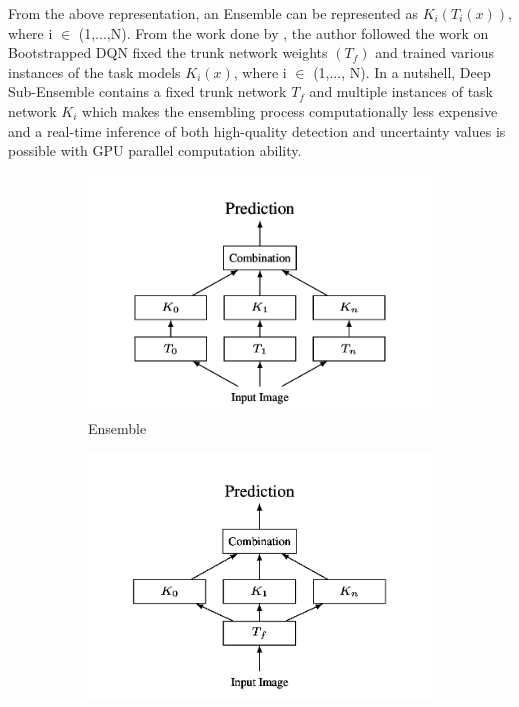     From the above representation, an Ensemble can be represented as $K_{i}(T_{i}(x))$, where i $\in$ (1,...,N). From the work done by \citet{ValdenegroToro2019}, the author followed the work on Bootstrapped DQN \cite{Osband} fixed the trunk network weights $(T_f)$ and trained various instances of the task models $K_{i}(x)$, where i $\in$ (1,..., N). In a nutshell, Deep Sub-Ensemble contains a fixed trunk network $T_f$ and multiple instances of task network $K_{i}$ which makes the ensembling process computationally less expensive and a real-time inference of both high-quality detection and uncertainty values is possible with GPU parallel computation ability. 
    
    \begin{figure}[H]
         \centering
         \begin{subfigure}[b]{0.495\textwidth}
             \centering
             \includegraphics[width=\textwidth]{images/frameworks/ensembles.png}
             \caption{Ensemble}
             \label{fig:Ensemble}
         \end{subfigure}
         \hfill
         \begin{subfigure}[b]{0.495\textwidth}
             \centering
             \includegraphics[width=\textwidth]{images/frameworks/subensembles.png}

\end{subfigure}
\end{figure}
